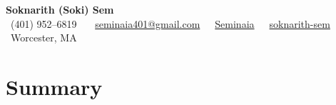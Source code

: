 \documentclass{article}
\begin{document}
\begin{center}
    {\LARGE \hypersetup{urlcolor=black}
    \textbf{Soknarith (Soki) Sem}} \\[10pt]
    {
    \faPhone\ (401) 952--6819 \, \textbar \,
    \faEnvelope\ \href{mailto:seminaia401@gmail.com}{seminaia401@gmail.com}\, \textbar \,
    \faGithub\ \href{https://github.com/seminaia}{Seminaia}\, \textbar \,
    \faLinkedin\ \href{https://linkedin.com/in/soknarith-sem}{soknarith-sem}\, \textbar \,
    \faMapMarker\ Worcester, MA
    }
\end{center}

\section{Summary}
\raggedright


\end{document}
